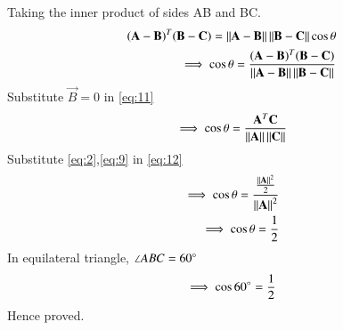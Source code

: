 \documentclass[journal,12pt,twocolumn]{IEEEtran}
\begin{document}
Taking the inner product of sides AB and BC.
\begin{align}
    (\mathbf{A}-\mathbf{B})^T(\mathbf{B}-\mathbf{C}) =
    \left\lVert\mathbf{A}-\mathbf{B}\right\rVert\left\lVert\mathbf{B}-\mathbf{C}\right\rVert\cos{\theta}\\
    \label{eq:11}\implies \cos{\theta}=\frac{(\mathbf{A}-\mathbf{B})^T(\mathbf{B}-\mathbf{C})}{\left\lVert\mathbf{A}-\mathbf{B}\right\rVert\left\lVert\mathbf{B}-\mathbf{C}\right\rVert}
\end{align}
Substitute $\vec{B}=0$ in \eqref{eq:11}
\begin{align}
    \label{eq:12}\implies\cos{\theta}=\frac{\mathbf{A}^T\mathbf{C}}{\left\lVert\mathbf{A}\right\rVert\left\lVert\mathbf{C}\right\rVert}
\end{align}
Substitute \eqref{eq:2},\eqref{eq:9} in \eqref{eq:12}
\begin{align}
    \implies\cos\theta=\frac{\frac{\left\lVert\mathbf{A}\right\rVert^2}{2}}{\left\lVert\mathbf{A}\right\rVert^2}\\
    \implies\cos\theta=\frac{1}{2}
\end{align}
In equilateral triangle, $\angle ABC=60\degree$
\begin{align}
    \implies\cos60\degree=\frac{1}{2}
\end{align}
Hence proved.
\end{document}
